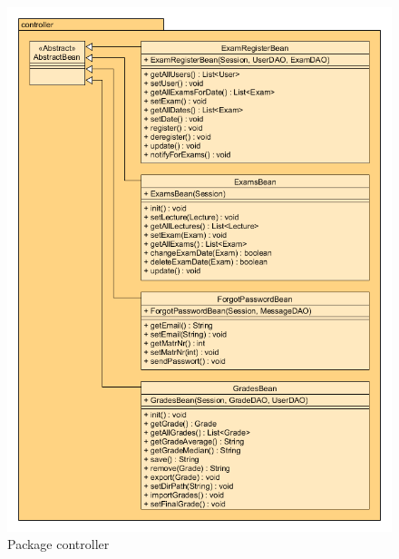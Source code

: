 \begin{figure}[H]
\includegraphics[width=\textwidth]{../UMLDiagramme/controller/gfx/4_package_controller_part_2.png}
	\caption{Package controller}
\end{figure}

